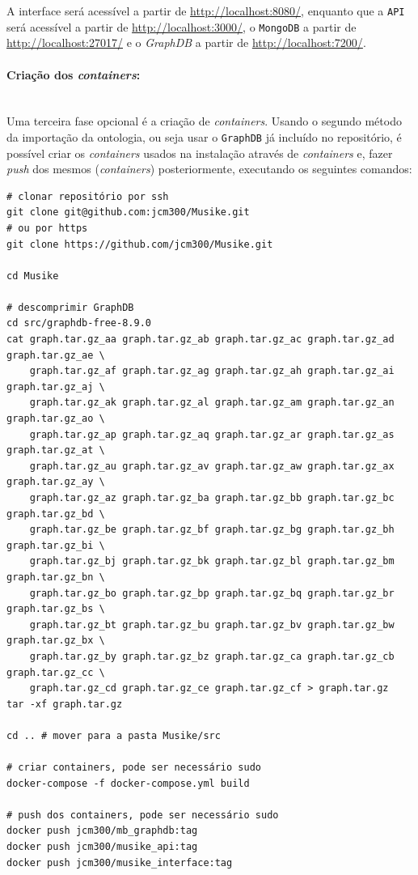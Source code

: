 \documentclass{article}
\begin{document}
A interface será acessível a partir de \url{http://localhost:8080/}, enquanto que a \texttt{API} será acessível a partir de \url{http://localhost:3000/}, o \texttt{MongoDB} a partir de \url{http://localhost:27017/} e o \textit{GraphDB} a partir de \url{http://localhost:7200/}.

\paragraph{Criação dos \textit{containers}:}\mbox{}\\

Uma terceira fase opcional é a criação de \textit{containers}. Usando o segundo método da importação da ontologia, ou seja usar o \texttt{GraphDB} já incluído no repositório, é possível criar os \textit{containers} usados na instalação através de \textit{containers} e, fazer \textit{push} dos mesmos (\textit{containers}) posteriormente, executando os seguintes comandos:

\begin{framed}
\begin{verbatim}
# clonar repositório por ssh
git clone git@github.com:jcm300/Musike.git
# ou por https
git clone https://github.com/jcm300/Musike.git

cd Musike

# descomprimir GraphDB
cd src/graphdb-free-8.9.0
cat graph.tar.gz_aa graph.tar.gz_ab graph.tar.gz_ac graph.tar.gz_ad graph.tar.gz_ae \
    graph.tar.gz_af graph.tar.gz_ag graph.tar.gz_ah graph.tar.gz_ai graph.tar.gz_aj \
    graph.tar.gz_ak graph.tar.gz_al graph.tar.gz_am graph.tar.gz_an graph.tar.gz_ao \
    graph.tar.gz_ap graph.tar.gz_aq graph.tar.gz_ar graph.tar.gz_as graph.tar.gz_at \
    graph.tar.gz_au graph.tar.gz_av graph.tar.gz_aw graph.tar.gz_ax graph.tar.gz_ay \
    graph.tar.gz_az graph.tar.gz_ba graph.tar.gz_bb graph.tar.gz_bc graph.tar.gz_bd \
    graph.tar.gz_be graph.tar.gz_bf graph.tar.gz_bg graph.tar.gz_bh graph.tar.gz_bi \
    graph.tar.gz_bj graph.tar.gz_bk graph.tar.gz_bl graph.tar.gz_bm graph.tar.gz_bn \
    graph.tar.gz_bo graph.tar.gz_bp graph.tar.gz_bq graph.tar.gz_br graph.tar.gz_bs \
    graph.tar.gz_bt graph.tar.gz_bu graph.tar.gz_bv graph.tar.gz_bw graph.tar.gz_bx \
    graph.tar.gz_by graph.tar.gz_bz graph.tar.gz_ca graph.tar.gz_cb graph.tar.gz_cc \
    graph.tar.gz_cd graph.tar.gz_ce graph.tar.gz_cf > graph.tar.gz
tar -xf graph.tar.gz

cd .. # mover para a pasta Musike/src

# criar containers, pode ser necessário sudo
docker-compose -f docker-compose.yml build

# push dos containers, pode ser necessário sudo
docker push jcm300/mb_graphdb:tag
docker push jcm300/musike_api:tag
docker push jcm300/musike_interface:tag
\end{verbatim}
\end{framed}
\end{document}
